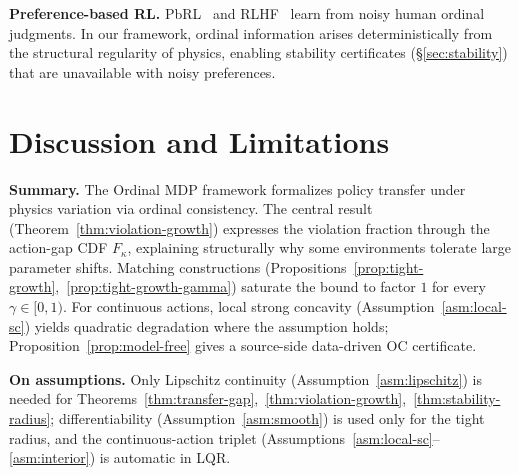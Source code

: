 \documentclass{article}
\begin{document}
\textbf{Preference-based RL.} PbRL~\citep{christiano2017deep, wirth2017survey} and RLHF~\citep{ouyang2022training} learn from noisy human ordinal judgments. In our framework, ordinal information arises deterministically from the structural regularity of physics, enabling stability certificates (\S\ref{sec:stability}) that are unavailable with noisy preferences.

\section{Discussion and Limitations}
\label{sec:discussion}

\textbf{Summary.} The Ordinal MDP framework formalizes policy transfer under physics variation via ordinal consistency. The central result (Theorem~\ref{thm:violation-growth}) expresses the violation fraction through the action-gap CDF $F_\kappa$, explaining structurally why some environments tolerate large parameter shifts. Matching constructions (Propositions~\ref{prop:tight-growth},~\ref{prop:tight-growth-gamma}) saturate the bound to factor $1$ for every $\gamma \in [0,1)$. For continuous actions, local strong concavity (Assumption~\ref{asm:local-sc}) yields quadratic degradation where the assumption holds; Proposition~\ref{prop:model-free} gives a source-side data-driven OC certificate.

\textbf{On assumptions.} Only Lipschitz continuity (Assumption~\ref{asm:lipschitz}) is needed for Theorems~\ref{thm:transfer-gap},~\ref{thm:violation-growth},~\ref{thm:stability-radius}; differentiability (Assumption~\ref{asm:smooth}) is used only for the tight radius, and the continuous-action triplet (Assumptions~\ref{asm:local-sc}--\ref{asm:interior}) is automatic in LQR.
\end{document}
